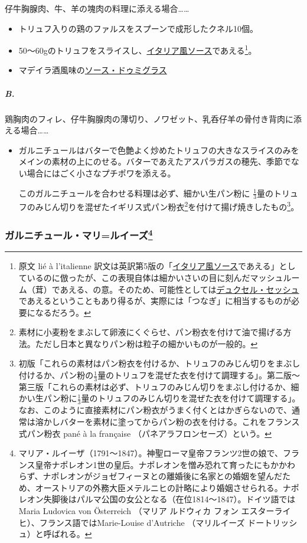 \begin{recette}
仔牛胸腺肉、牛、羊の塊肉の料理に添える場合\ldots{}\ldots{}

\begin{itemize}
\item
  トリュフ入りの鶏のファルスをスプーンで成形したクネル10個。
\item
  50〜60gのトリュフをスライスし、\protect\hyperlink{sauce-italienne}{イタリア風ソース}であえる\footnote{原文
    lié à l'italienne
    訳文は英訳第5版の「\protect\hyperlink{sauce-italienne}{イタリア風ソース}であえる」としているのに倣ったが、この表現自体は細かいさいの目に刻んだマッシュルーム（茸）であえる、の意。そのため、可能性としては\protect\hyperlink{duxelles-seche}{デュクセル・セッシュ}であえるということもあり得るが、実際には「つなぎ」に相当するものが必要になるだろう。}。
\item
  マデイラ酒風味の\protect\hyperlink{sauce-demi-glace}{ソース・ドゥミグラス}
\end{itemize}

\hypertarget{b.}{%
\subparagraph{B.}\label{b.}}

鶏胸肉のフィレ、仔牛胸腺肉の薄切り、ノワゼット、乳呑仔羊の骨付き背肉に添える場合\ldots{}\ldots{}

\begin{itemize}
\item
  ガルニチュールはバターで色艶よく炒めたトリュフの大きなスライスのみをメインの素材の上にのせる。バターであえたアスパラガスの穂先、季節でない場合にはごく小さなプチポワを添える。

  このガルニチュールを合わせる料理は必ず、細かい生パン粉に
  \(\frac{1}{3}\)量のトリュフのみじん切りを混ぜたイギリス式パン粉衣\footnote{素材に小麦粉をまぶして卵液にくぐらせ、パン粉衣を付けて油で揚げる方法。ただし日本と異なりパン粉は粒子の細かいものが一般的。}を付けて揚げ焼きしたもの\footnote{初版「これらの素材はパン粉衣を付けるか、トリュフのみじん切りをまぶし付けるか、パン粉の\(\frac{1}{3}\)量のトリュフを混ぜた衣を付けて調理する」。第二版〜第三版「これらの素材は必ず、トリュフのみじん切りをまぶし付けるか、細かい生パン粉に\(\frac{1}{3}\)量のトリュフのみじん切りを混ぜた衣を付けて調理する」。なお、このように直接素材にパン粉衣がうまく付くとはかぎらないので、通常は溶かしバターを素材に塗ってからパン粉の衣を付ける。これをフランス式パン粉衣
    pané à la française （パネアラフロンセーズ）という。}。
\end{itemize}

\hypertarget{garniture-marie-louise}{%
\subsubsection[ガルニチュール・マリ=ルイーズ]{\texorpdfstring{ガルニチュール・マリ=ルイーズ\footnote{マリア・ルイーザ（1791〜1847）。神聖ローマ皇帝フランツ2世の娘で、フランス皇帝ナポレオン1世の皇后。ナポレオンを憎み恐れて育ったにもかかわらず、ナポレオンがジョゼフィーヌとの離婚後に名家との婚姻を望んだため、オーストリアの外務大臣メテルニヒの計略により婚姻させられる。ナポレオン失脚後はパルマ公国の女公となる（在位1814〜1847）。ドイツ語ではMaria
  Ludovica von Österreich （マリア ルドウィカ フォン
  エスターライヒ）、フランス語ではMarie-Louise d'Autriche （マリルイーズ
  ドートリッシュ）と呼ばれる。}}{ガルニチュール・マリ=ルイーズ}}\label{garniture-marie-louise}}


\end{recette}
